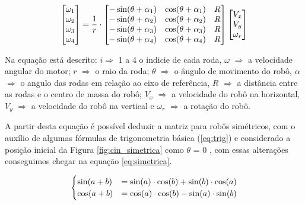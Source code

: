 \documentclass[deposito, acronym, symbols]{fei}
\begin{document}
\begin{equation} \label{eq:matrizvelocidade}
\centering  
\begin{bmatrix}\omega_1\\\omega_2\\\omega_3\\\omega_4\end{bmatrix} = \frac{1}{r} \cdot 
   \begin{bmatrix}-\sin(\theta+\alpha_1)&\cos(\theta+\alpha_1)&R\\-\sin(\theta+\alpha_2)&\cos(\theta+\alpha_2)&R\\-\sin(\theta+\alpha_3)&\cos(\theta+\alpha_3)&R\\-\sin(\theta+\alpha_4)&\cos(\theta+\alpha_4)&R \end{bmatrix}
   \begin{bmatrix}V_x\\V_y\\\omega_r\end{bmatrix}  
\end{equation}


Na equação está descrito: $i\Rightarrow$  1 a 4 o indicie de cada roda, $\omega$ $\Rightarrow$ a velocidade angular do motor; $r$ $\Rightarrow$ o raio da roda;  $\theta$ $\Rightarrow$ o ângulo de movimento do robô, $\alpha$ $\Rightarrow$ o angulo das rodas em relação ao eixo de referência, $R$ $\Rightarrow$ a distância entre as rodas e o centro de massa do robô; $V_x$ $\Rightarrow$ a velocidade do robô na horizontal, $V_y$ $\Rightarrow$ a velocidade do robô na vertical e $\omega_r$ $\Rightarrow$ a rotação do robô.

A partir desta equação é possível deduzir a matriz para robôs simétricos, com o auxílio de algumas fórmulas de trigonometria básica (\ref{eq:trig}) e considerado a posição inicial da Figura \ref{fig:cin_simetrica}  como $\theta$ = 0 , com essas alterações conseguimos chegar na equação \ref{eq:simetrica}.



\begin{equation} \label{eq:trig}
\centering  
\begin{cases} \sin(a+b)& = \sin(a)\cdot \cos(b) +\sin(b)\cdot \cos(a) \\
              \cos(a+b)& = \cos(a)\cdot \cos(b) -\sin(a)\cdot \sin(b)  \end{cases}
\end{equation}
\end{document}
